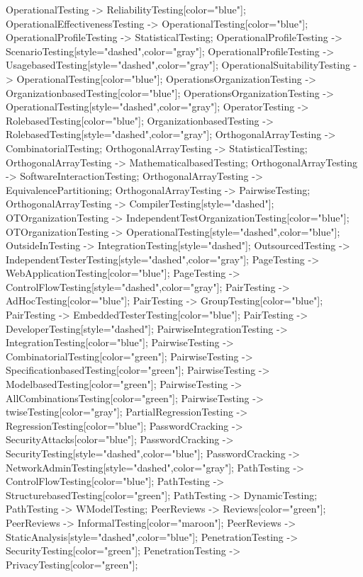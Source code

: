 \documentclass{article}
\begin{document}
{OperationalTesting -> ReliabilityTesting[color="blue"];
OperationalEffectivenessTesting -> OperationalTesting[color="blue"];
OperationalProfileTesting -> StatisticalTesting;
OperationalProfileTesting -> ScenarioTesting[style="dashed",color="gray"];
OperationalProfileTesting -> UsagebasedTesting[style="dashed",color="gray"];
OperationalSuitabilityTesting -> OperationalTesting[color="blue"];
OperationsOrganizationTesting -> OrganizationbasedTesting[color="blue"];
OperationsOrganizationTesting -> OperationalTesting[style="dashed",color="gray"];
OperatorTesting -> RolebasedTesting[color="blue"];
OrganizationbasedTesting -> RolebasedTesting[style="dashed",color="gray"];
OrthogonalArrayTesting -> CombinatorialTesting;
OrthogonalArrayTesting -> StatisticalTesting;
OrthogonalArrayTesting -> MathematicalbasedTesting;
OrthogonalArrayTesting -> SoftwareInteractionTesting;
OrthogonalArrayTesting -> EquivalencePartitioning;
OrthogonalArrayTesting -> PairwiseTesting;
OrthogonalArrayTesting -> CompilerTesting[style="dashed"];
OTOrganizationTesting -> IndependentTestOrganizationTesting[color="blue"];
OTOrganizationTesting -> OperationalTesting[style="dashed",color="blue"];
OutsideInTesting -> IntegrationTesting[style="dashed"];
OutsourcedTesting -> IndependentTesterTesting[style="dashed",color="gray"];
PageTesting -> WebApplicationTesting[color="blue"];
PageTesting -> ControlFlowTesting[style="dashed",color="gray"];
PairTesting -> AdHocTesting[color="blue"];
PairTesting -> GroupTesting[color="blue"];
PairTesting -> EmbeddedTesterTesting[color="blue"];
PairTesting -> DeveloperTesting[style="dashed"];
PairwiseIntegrationTesting -> IntegrationTesting[color="blue"];
PairwiseTesting -> CombinatorialTesting[color="green"];
PairwiseTesting -> SpecificationbasedTesting[color="green"];
PairwiseTesting -> ModelbasedTesting[color="green"];
PairwiseTesting -> AllCombinationsTesting[color="green"];
PairwiseTesting -> twiseTesting[color="gray"];
PartialRegressionTesting -> RegressionTesting[color="blue"];
PasswordCracking -> SecurityAttacks[color="blue"];
PasswordCracking -> SecurityTesting[style="dashed",color="blue"];
PasswordCracking -> NetworkAdminTesting[style="dashed",color="gray"];
PathTesting -> ControlFlowTesting[color="blue"];
PathTesting -> StructurebasedTesting[color="green"];
PathTesting -> DynamicTesting;
PathTesting -> WModelTesting;
PeerReviews -> Reviews[color="green"];
PeerReviews -> InformalTesting[color="maroon"];
PeerReviews -> StaticAnalysis[style="dashed",color="blue"];
PenetrationTesting -> SecurityTesting[color="green"];
PenetrationTesting -> PrivacyTesting[color="green"];
}
\end{document}
